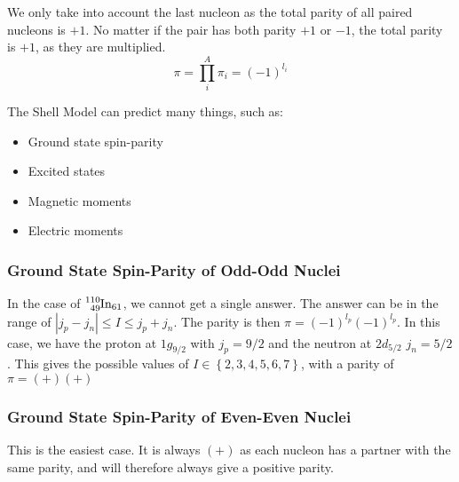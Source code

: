 
We only take into account the last nucleon as the total parity of all paired nucleons is $+1$. No matter if the pair has both parity $+1$ or $-1$, the total parity is $+1$, as they are multiplied. 
\begin{equation}
  π = ∏_{i}^{A}  π_i = (-1)^{l_i}
\end{equation}

The Shell Model can predict many things, such as:
\begin{itemize}
    \item Ground state spin-parity 
    \item Excited states 
    \item Magnetic moments
    \item Electric moments 
\end{itemize}

\subsubsection{Ground State Spin-Parity of Odd-Odd Nuclei}
In the case of $\ce{_{49}^{110}\text{In}_{61}}$, we cannot get a single answer. The answer can be in the range of $\left|j_p - j_n\right| ≤ I ≤ j_p + j_n$. The parity is then $π = (-1)^{l_p} (-1)^{l_p}$. In this case, we have the proton at $1g_{9/2}$ with $j_p = 9/2$ and the neutron at $2d_{5/2}$ $j_n = 5/2$. This gives the possible values of $I ∈ \left\{2, 3, 4, 5, 6, 7\right\}$, with a parity of $π = (+)(+)$

\subsubsection{Ground State Spin-Parity of Even-Even Nuclei}
This is the easiest case. It is always $(+)$ as each nucleon has a partner with the same parity, and will therefore always give a positive parity.